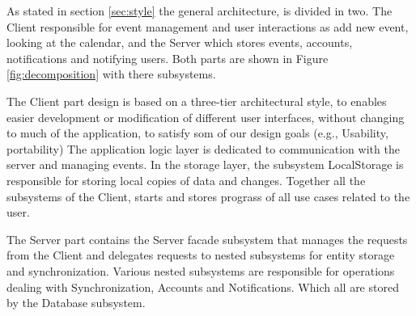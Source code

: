\documentclass[a4paper]{article}
\begin{document}
As stated in section \ref{sec:style} the general architecture, is divided in two. The Client responsible for event management and user interactions as add new event, looking at the calendar, and the Server which stores events, accounts, notifications and notifying users. Both parts are shown in Figure \ref{fig:decomposition} with there subsystems.

The Client part design is based on a three-tier architectural style, to enables easier development or modification of different user interfaces, without changing to much of the application, to satisfy som of our design goals (e.g., Usability, portability) The application logic layer is dedicated to communication with the server and managing events. In the storage layer, the subsystem LocalStorage is responsible for storing local copies of data and changes. Together all the subsystems of the Client, starts and stores prograss of all use cases related to the user.

The Server part contains the Server facade subsystem that manages the requests from the Client and delegates requests to nested subsystems for entity storage and synchronization. Various nested subsystems are responsible for operations dealing with Synchronization, Accounts and Notifications. Which all are stored by the Database subsystem.
\end{document}
